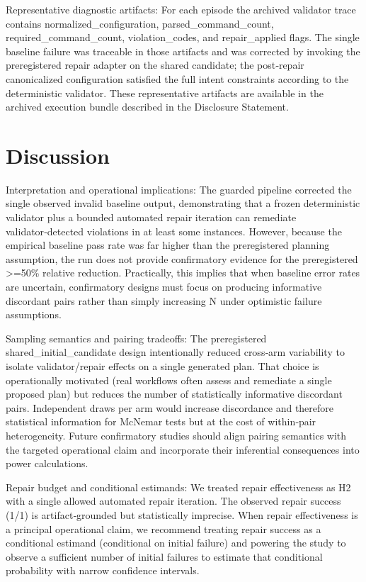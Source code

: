 \documentclass[conference]{IEEEtran}
\begin{document}
Representative diagnostic artifacts: For each episode the archived validator trace contains normalized\_configuration, parsed\_command\_count, required\_command\_count, violation\_codes, and repair\_applied flags. The single baseline failure was traceable in those artifacts and was corrected by invoking the preregistered repair adapter on the shared candidate; the post‑repair canonicalized configuration satisfied the full intent constraints according to the deterministic validator. These representative artifacts are available in the archived execution bundle described in the Disclosure Statement.

\section{Discussion}
Interpretation and operational implications: The guarded pipeline corrected the single observed invalid baseline output, demonstrating that a frozen deterministic validator plus a bounded automated repair iteration can remediate validator‑detected violations in at least some instances. However, because the empirical baseline pass rate was far higher than the preregistered planning assumption, the run does not provide confirmatory evidence for the preregistered >=50\% relative reduction. Practically, this implies that when baseline error rates are uncertain, confirmatory designs must focus on producing informative discordant pairs rather than simply increasing N under optimistic failure assumptions.

Sampling semantics and pairing tradeoffs: The preregistered shared\_initial\_candidate design intentionally reduced cross‑arm variability to isolate validator/repair effects on a single generated plan. That choice is operationally motivated (real workflows often assess and remediate a single proposed plan) but reduces the number of statistically informative discordant pairs. Independent draws per arm would increase discordance and therefore statistical information for McNemar tests but at the cost of within‑pair heterogeneity. Future confirmatory studies should align pairing semantics with the targeted operational claim and incorporate their inferential consequences into power calculations.

Repair budget and conditional estimands: We treated repair effectiveness as H2 with a single allowed automated repair iteration. The observed repair success (1/1) is artifact‑grounded but statistically imprecise. When repair effectiveness is a principal operational claim, we recommend treating repair success as a conditional estimand (conditional on initial failure) and powering the study to observe a sufficient number of initial failures to estimate that conditional probability with narrow confidence intervals.
\end{document}

